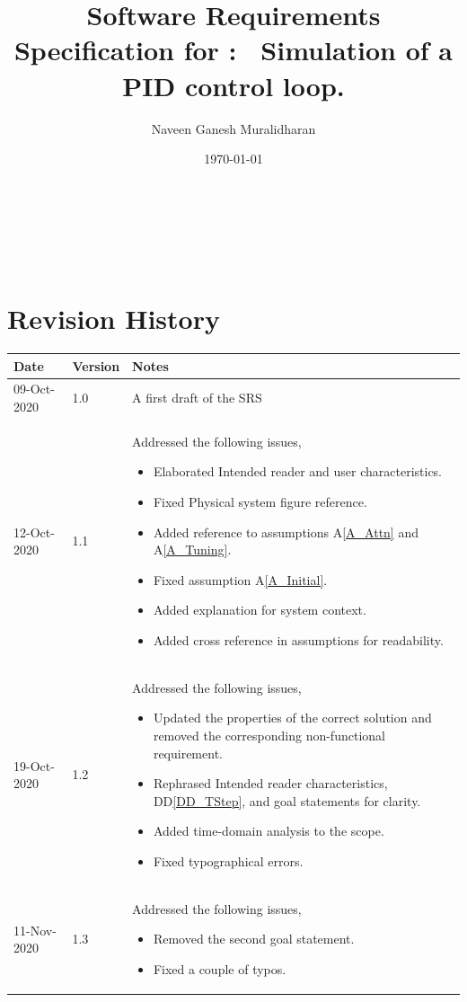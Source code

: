 \documentclass[12pt]{article}
\newcommand{\ddref}[1]{DD\ref{#1}}
\newcommand{\aref}[1]{A\ref{#1}}
\begin{document}
\title{Software Requirements Specification for \progname: \
Simulation of a PID control loop.} 
\author{Naveen Ganesh Muralidharan}
\date{\today}
	
\maketitle

~\newpage


\tableofcontents

~\newpage

\section*{Revision History}

\begin{tabularx}{\textwidth}{p{3cm}p{2cm}X}
\toprule {\bf Date} & {\bf Version} & {\bf Notes}\\
\midrule
09-Oct-2020 & 1.0 & A first draft of the SRS\\
12-Oct-2020 & 1.1 & Addressed the following issues,
\begin{itemize}
\item Elaborated Intended reader and user characteristics.
\item Fixed Physical system figure reference.
\item Added reference to assumptions \aref{A_Attn} and \aref{A_Tuning}.
\item Fixed assumption \aref{A_Initial}.
\item Added explanation for system context.
\item Added cross reference in assumptions for readability.
\end{itemize}\\
19-Oct-2020 & 1.2 & Addressed the following issues,
\begin{itemize}
\item Updated the properties of the correct solution and removed the corresponding
non-functional requirement.
\item Rephrased Intended reader characteristics, \ddref{DD_TStep}, and goal statements for
clarity.
\item Added time-domain analysis to the scope.
\item Fixed typographical errors.
\end{itemize}\\
11-Nov-2020 & 1.3 & Addressed the following issues,
\begin{itemize}
\item Removed the second goal statement.
\item Fixed a couple of typos.
\end{itemize}\\
\bottomrule
\end{tabularx}
\end{document}
